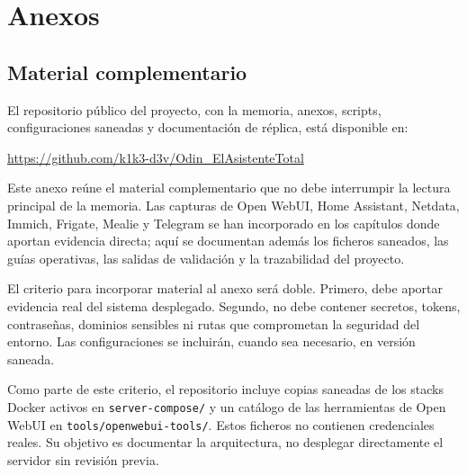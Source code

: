 \chapter{Anexos}

\section{Material complementario}
El repositorio público del proyecto, con la memoria, anexos, scripts, configuraciones saneadas y documentación de réplica, está disponible en:

\begin{center}
  \url{https://github.com/k1k3-d3v/Odin_ElAsistenteTotal}
\end{center}

Este anexo reúne el material complementario que no debe interrumpir la lectura principal de la memoria. Las capturas de Open WebUI, Home Assistant, Netdata, Immich, Frigate, Mealie y Telegram se han incorporado en los capítulos donde aportan evidencia directa; aquí se documentan además los ficheros saneados, las guías operativas, las salidas de validación y la trazabilidad del proyecto.

El criterio para incorporar material al anexo será doble. Primero, debe aportar evidencia real del sistema desplegado. Segundo, no debe contener secretos, tokens, contraseñas, dominios sensibles ni rutas que comprometan la seguridad del entorno. Las configuraciones se incluirán, cuando sea necesario, en versión saneada.

Como parte de este criterio, el repositorio incluye copias saneadas de los stacks Docker activos en \nolinkurl{server-compose/} y un catálogo de las herramientas de Open WebUI en \nolinkurl{tools/openwebui-tools/}. Estos ficheros no contienen credenciales reales. Su objetivo es documentar la arquitectura, no desplegar directamente el servidor sin revisión previa.

